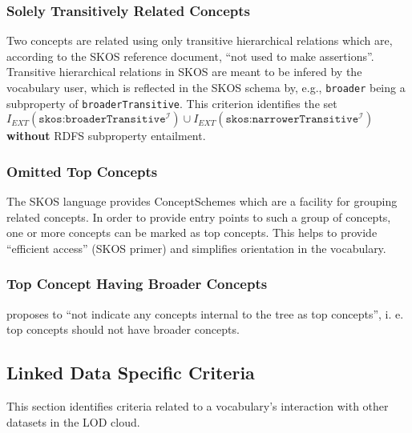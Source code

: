 \subsubsection{Solely Transitively Related Concepts}
Two concepts are related using only transitive hierarchical relations which are, according to the SKOS reference document, ``not used to make assertions''. Transitive hierarchical relations in SKOS are meant to be infered by the vocabulary user, which is reflected in the SKOS schema by, e.g., \texttt{broader} being a subproperty of \texttt{broaderTransitive}. This criterion identifies the set $I_{EXT}(\texttt{skos:broaderTransitive}^\mathcal{I}) \cup I_{EXT}(\texttt{skos:narrowerTransitive}^\mathcal{I})$ \textbf{without} RDFS subproperty entailment.

\subsubsection{Omitted Top Concepts}
The SKOS language provides ConceptSchemes which are a facility for grouping related concepts. In order to provide entry points to such a group of concepts, one or more concepts can be marked as top concepts. This helps to provide ``efficient access'' (SKOS primer) and simplifies orientation in the vocabulary. 


\subsubsection{Top Concept Having Broader Concepts}
\cite{Allemang2011} proposes to ``not indicate any concepts internal to the tree as top concepts'', i. e. top concepts should not have broader concepts.


\subsection{Linked Data Specific Criteria}

This section identifies criteria related to a vocabulary's interaction with other datasets in the LOD cloud.


